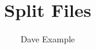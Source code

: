 \documentclass{article}
\begin{document}
\title{Split Files}
\author{Dave Example}
\maketitle


\end{document}

